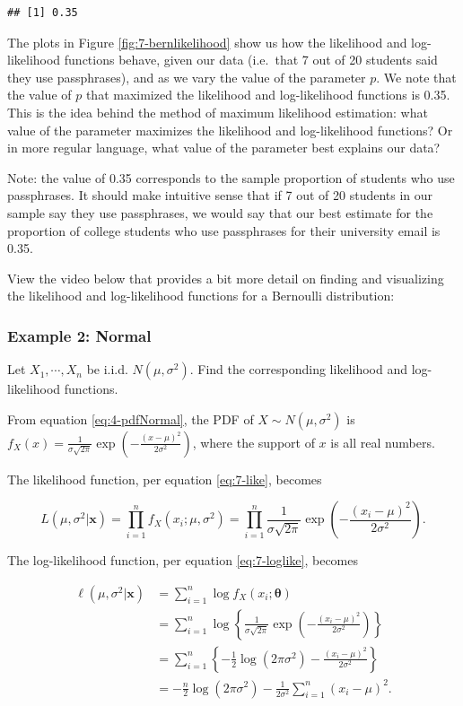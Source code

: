 \documentclass[
]{book}
\begin{document}
\begin{verbatim}
## [1] 0.35
\end{verbatim}

The plots in Figure \ref{fig:7-bernlikelihood} show us how the likelihood and log-likelihood functions behave, given our data (i.e.~that 7 out of 20 students said they use passphrases), and as we vary the value of the parameter \(p\). We note that the value of \(p\) that maximized the likelihood and log-likelihood functions is 0.35. This is the idea behind the method of maximum likelihood estimation: what value of the parameter maximizes the likelihood and log-likelihood functions? Or in more regular language, what value of the parameter best explains our data?

Note: the value of 0.35 corresponds to the sample proportion of students who use passphrases. It should make intuitive sense that if 7 out of 20 students in our sample say they use passphrases, we would say that our best estimate for the proportion of college students who use passphrases for their university email is 0.35.

View the video below that provides a bit more detail on finding and visualizing the likelihood and log-likelihood functions for a Bernoulli distribution:

\hypertarget{example-2-normal}{%
\subsubsection{Example 2: Normal}\label{example-2-normal}}

Let \(X_1, \cdots, X_n\) be i.i.d. \(N(\mu, \sigma^2)\). Find the corresponding likelihood and log-likelihood functions.

From equation \eqref{eq:4-pdfNormal}, the PDF of \(X \sim N(\mu, \sigma^2)\) is \(f_X(x) = \frac{1}{\sigma \sqrt{2 \pi}} \exp \left(-\frac{(x - \mu)^2}{2 \sigma^2} \right)\), where the support of \(x\) is all real numbers.

The likelihood function, per equation \eqref{eq:7-like}, becomes

\[
L(\mu, \sigma^2 | \boldsymbol{x} ) = \prod_{i=1}^n f_X(x_i; \mu, \sigma^2) = \prod_{i=1}^n \frac{1}{\sigma \sqrt{2 \pi}} \exp \left(-\frac{(x_i - \mu)^2}{2 \sigma^2} \right).
\]

The log-likelihood function, per equation \eqref{eq:7-loglike}, becomes

\[
\begin{split}
\ell (\mu, \sigma^2 | \boldsymbol{x}) &= \sum_{i=1}^n \log f_X(x_i; \boldsymbol{\theta}) \\
                          &= \sum_{i=1}^n \log \left\{ \frac{1}{\sigma \sqrt{2 \pi}} \exp \left(-\frac{(x_i - \mu)^2}{2 \sigma^2} \right) \right\} \\
                          &= \sum_{i=1}^n \left\{-\frac{1}{2} \log (2 \pi \sigma^2) -\frac{(x_i - \mu)^2}{2 \sigma^2} \right\} \\
                          &= -\frac{n}{2} \log (2 \pi \sigma^2) - \frac{1}{2 \sigma^2} \sum_{i=1}^n (x_i - \mu)^2.
\end{split}
\]
\end{document}
